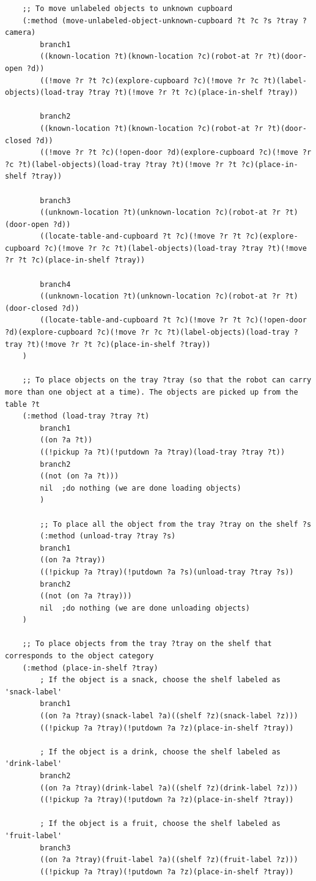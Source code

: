 \documentclass[paper=a4, fontsize=11pt]{scrartcl}
\begin{document}
\begin{lstlisting}
	;; To move unlabeled objects to unknown cupboard
	(:method (move-unlabeled-object-unknown-cupboard ?t ?c ?s ?tray ?camera)
		branch1
		((known-location ?t)(known-location ?c)(robot-at ?r ?t)(door-open ?d))
		((!move ?r ?t ?c)(explore-cupboard ?c)(!move ?r ?c ?t)(label-objects)(load-tray ?tray ?t)(!move ?r ?t ?c)(place-in-shelf ?tray))
		
		branch2
		((known-location ?t)(known-location ?c)(robot-at ?r ?t)(door-closed ?d))
		((!move ?r ?t ?c)(!open-door ?d)(explore-cupboard ?c)(!move ?r ?c ?t)(label-objects)(load-tray ?tray ?t)(!move ?r ?t ?c)(place-in-shelf ?tray))
		
		branch3
		((unknown-location ?t)(unknown-location ?c)(robot-at ?r ?t)(door-open ?d))
		((locate-table-and-cupboard ?t ?c)(!move ?r ?t ?c)(explore-cupboard ?c)(!move ?r ?c ?t)(label-objects)(load-tray ?tray ?t)(!move ?r ?t ?c)(place-in-shelf ?tray))
		
		branch4
		((unknown-location ?t)(unknown-location ?c)(robot-at ?r ?t)(door-closed ?d))
		((locate-table-and-cupboard ?t ?c)(!move ?r ?t ?c)(!open-door ?d)(explore-cupboard ?c)(!move ?r ?c ?t)(label-objects)(load-tray ?tray ?t)(!move ?r ?t ?c)(place-in-shelf ?tray))
	)
	
	;; To place objects on the tray ?tray (so that the robot can carry more than one object at a time). The objects are picked up from the table ?t
	(:method (load-tray ?tray ?t)
		branch1
		((on ?a ?t))
		((!pickup ?a ?t)(!putdown ?a ?tray)(load-tray ?tray ?t))
		branch2
		((not (on ?a ?t)))
		nil  ;do nothing (we are done loading objects)
		)
		
		;; To place all the object from the tray ?tray on the shelf ?s
		(:method (unload-tray ?tray ?s)
		branch1
		((on ?a ?tray))
		((!pickup ?a ?tray)(!putdown ?a ?s)(unload-tray ?tray ?s))
		branch2
		((not (on ?a ?tray)))
		nil  ;do nothing (we are done unloading objects)
	)
	
	;; To place objects from the tray ?tray on the shelf that corresponds to the object category
	(:method (place-in-shelf ?tray)
		; If the object is a snack, choose the shelf labeled as 'snack-label'
		branch1
		((on ?a ?tray)(snack-label ?a)((shelf ?z)(snack-label ?z)))
		((!pickup ?a ?tray)(!putdown ?a ?z)(place-in-shelf ?tray))
		
		; If the object is a drink, choose the shelf labeled as 'drink-label'
		branch2
		((on ?a ?tray)(drink-label ?a)((shelf ?z)(drink-label ?z)))
		((!pickup ?a ?tray)(!putdown ?a ?z)(place-in-shelf ?tray))
		
		; If the object is a fruit, choose the shelf labeled as 'fruit-label'
		branch3
		((on ?a ?tray)(fruit-label ?a)((shelf ?z)(fruit-label ?z)))
		((!pickup ?a ?tray)(!putdown ?a ?z)(place-in-shelf ?tray))
		

\end{lstlisting}
\end{document}
